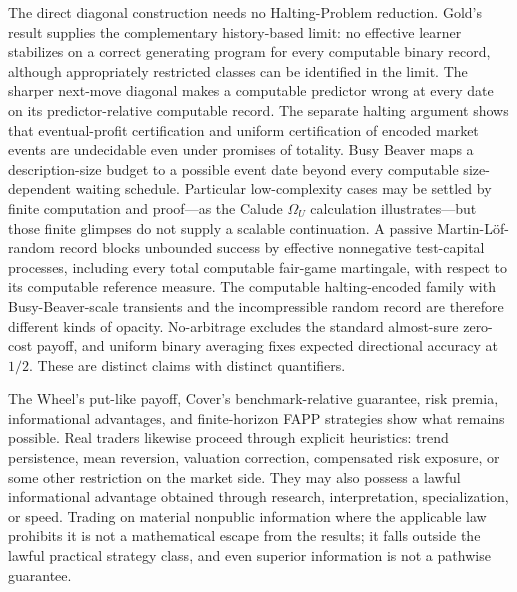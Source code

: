 \documentclass[aps,pra,reprint,superscriptaddress,amsmath,amssymb,floatfix]{revtex4-2}
\theoremstyle{plain}
\theoremstyle{definition}
\theoremstyle{remark}
\begin{document}
The direct diagonal construction needs no Halting-Problem reduction. Gold's
result supplies the complementary history-based limit: no effective
learner stabilizes on a correct generating program for every computable binary
record, although appropriately restricted classes can be identified in the
limit. The sharper next-move diagonal makes a computable predictor wrong at
every date on its predictor-relative computable record. The separate halting
argument shows that eventual-profit certification and uniform certification of
encoded market events are undecidable even under promises of totality.
Busy Beaver maps a description-size budget to a possible event date beyond
every computable size-dependent waiting schedule. Particular low-complexity
cases may be settled by finite computation and proof---as the Calude
\(\Omega_U\) calculation illustrates---but those finite glimpses do not supply
a scalable continuation. A passive Martin-L\"of-random record blocks unbounded
success by effective nonnegative test-capital processes, including every total
computable fair-game martingale, with respect to its computable reference
measure. The computable halting-encoded family with Busy-Beaver-scale
transients and the incompressible random record are therefore different kinds
of opacity. No-arbitrage excludes the standard almost-sure zero-cost payoff,
and uniform binary averaging fixes expected directional accuracy at \(1/2\).
These are distinct claims with distinct quantifiers.

The Wheel's put-like payoff, Cover's benchmark-relative guarantee, risk
premia, informational advantages, and finite-horizon FAPP strategies show what
remains possible. Real traders likewise proceed through explicit heuristics:
trend persistence, mean reversion, valuation correction, compensated risk
exposure, or some other restriction on the market side. They may also possess
a lawful informational advantage obtained through research, interpretation,
specialization, or speed. Trading on material nonpublic information where the
applicable law prohibits it is not a mathematical escape from the results; it
falls outside the lawful practical strategy class, and even superior
information is not a pathwise guarantee.
\end{document}
